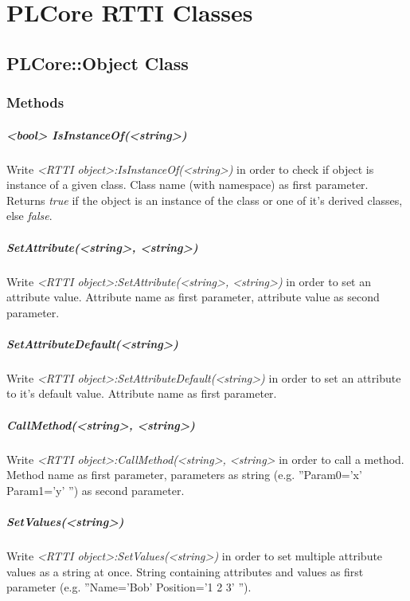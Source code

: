 \chapter{PLCore \ac{RTTI} Classes}




\section{PLCore::Object Class}


\subsection{Methods}

\paragraph{<bool> IsInstanceOf(<string>)}
Write \emph{<RTTI object>:IsInstanceOf(<string>)} in order to check if object is instance of a given class. Class name (with namespace) as first parameter. Returns \emph{true} if the object is an instance of the class or one of it's derived classes, else \emph{false}.

\paragraph{SetAttribute(<string>, <string>)}
Write \emph{<RTTI object>:SetAttribute(<string>, <string>)} in order to set an attribute value. Attribute name as first parameter, attribute value as second parameter.

\paragraph{SetAttributeDefault(<string>)}
Write \emph{<RTTI object>:SetAttributeDefault(<string>)} in order to set an attribute to it's default value. Attribute name as first parameter.

\paragraph{CallMethod(<string>, <string>)}
Write \emph{<RTTI object>:CallMethod(<string>, <string>} in order to call a method. Method name as first parameter, parameters as string (e.g. ''Param0='x' Param1='y' '') as second parameter.

\paragraph{SetValues(<string>)}
Write \emph{<RTTI object>:SetValues(<string>)} in order to set multiple attribute values as a string at once. String containing attributes and values as first parameter (e.g. ''Name='Bob' Position='1 2 3' '').

